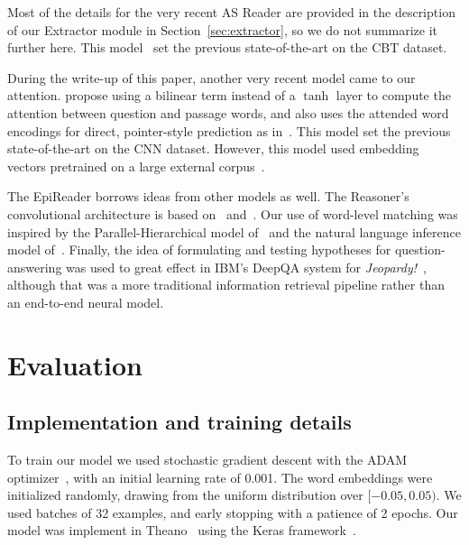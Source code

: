 \documentclass[11pt,letterpaper]{article}
\begin{document}
Most of the details for the very recent AS Reader are provided in the description of our Extractor module in Section~\ref{sec:extractor}, so we do not summarize it further here. This model~\cite{kadlec2016} set the previous state-of-the-art on the CBT dataset.

During the write-up of this paper, another very recent model came to our attention.  propose using a bilinear term instead of a $\tanh$ layer to compute the attention between question and passage words, and also uses the attended word encodings for direct, pointer-style prediction as in~. This model set the previous state-of-the-art on the CNN dataset. However, this model used embedding vectors pretrained on a large external corpus~\cite{pennington2014}.

The EpiReader borrows ideas from other models as well. The Reasoner's convolutional architecture is based on~ and~. Our use of word-level matching was inspired by the Parallel-Hierarchical model of~ and the natural language inference model of~. Finally, the idea of formulating and testing hypotheses for question-answering was used to great effect in IBM's DeepQA system for {\it Jeopardy!}~\cite{ferrucci2010}, although that was a more traditional information retrieval pipeline rather than an end-to-end neural model.


\section{Evaluation}
\label{sec:res}
\subsection{Implementation and training details}
To train our model we used stochastic gradient descent with the ADAM optimizer~\cite{kingma2014}, with an initial learning rate of 0.001. The word embeddings were initialized randomly, drawing from the uniform distribution over $[-0.05, 0.05)$. We used batches of 32 examples, and early stopping with a patience of 2 epochs. Our model was implement in Theano~\cite{theano10} using the Keras framework~\cite{keras}.
\end{document}

